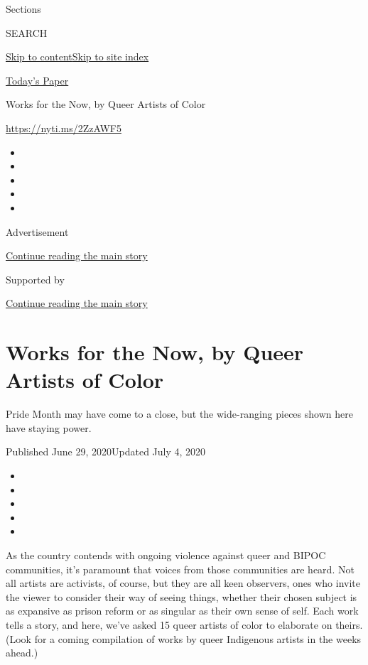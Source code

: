 Sections

SEARCH

\protect\hyperlink{site-content}{Skip to
content}\protect\hyperlink{site-index}{Skip to site index}

\href{https://myaccount.nytimes3xbfgragh.onion/auth/login?response_type=cookie\&client_id=vi}{}

\href{https://www.nytimes3xbfgragh.onion/section/todayspaper}{Today's
Paper}

Works for the Now, by Queer Artists of Color

\url{https://nyti.ms/2ZzAWF5}

\begin{itemize}
\item
\item
\item
\item
\item
\end{itemize}

Advertisement

\protect\hyperlink{after-top}{Continue reading the main story}

Supported by

\protect\hyperlink{after-sponsor}{Continue reading the main story}

\hypertarget{works-for-the-now-by-queer-artists-of-color}{%
\section{Works for the Now, by Queer Artists of
Color}\label{works-for-the-now-by-queer-artists-of-color}}

Pride Month may have come to a close, but the wide-ranging pieces shown
here have staying power.

Published June 29, 2020Updated July 4, 2020

\begin{itemize}
\item
\item
\item
\item
\item
\end{itemize}

As the country contends with ongoing violence against queer and BIPOC
communities, it's paramount that voices from those communities are
heard. Not all artists are activists, of course, but they are all keen
observers, ones who invite the viewer to consider their way of seeing
things, whether their chosen subject is as expansive as prison reform or
as singular as their own sense of self. Each work tells a story, and
here, we've asked 15 queer artists of color to elaborate on theirs.
(Look for a coming compilation of works by queer Indigenous artists in
the weeks ahead.)

